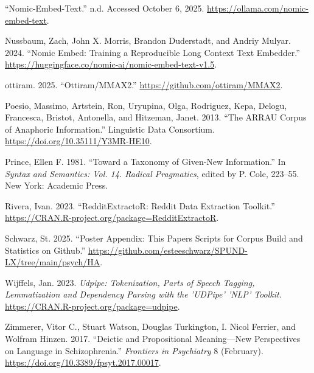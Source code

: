 \documentclass[12pt,a4paper]{article}
\begin{document}
\begin{CSLReferences}{1}{0}
{``Nomic-Embed-Text.''} n.d. Accessed October 6, 2025. \url{https://ollama.com/nomic-embed-text}.

Nussbaum, Zach, John X. Morris, Brandon Duderstadt, and Andriy Mulyar. 2024. {``Nomic {Embed}: {Training} a {Reproducible} {Long} {Context} {Text} {Embedder}.''} \url{https://huggingface.co/nomic-ai/nomic-embed-text-v1.5}.

ottiram. 2025. {``Ottiram/{MMAX2}.''} \url{https://github.com/ottiram/MMAX2}.

Poesio, Massimo, Artstein, Ron, Uryupina, Olga, Rodriguez, Kepa, Delogu, Francesca, Bristot, Antonella, and Hitzeman, Janet. 2013. {``The {ARRAU} {Corpus} of {Anaphoric} {Information}.''} Linguistic Data Consortium. \url{https://doi.org/10.35111/Y3MR-HE10}.

Prince, Ellen F. 1981. {``Toward a Taxonomy of Given-New Information.''} In \emph{Syntax and Semantics: {Vol}. 14. {Radical} {Pragmatics}}, edited by P. Cole, 223--55. New York: Academic Press.

Rivera, Ivan. 2023. {``{RedditExtractoR}: {Reddit} {Data} {Extraction} {Toolkit}.''} \url{https://CRAN.R-project.org/package=RedditExtractoR}.

Schwarz, St. 2025. {``Poster Appendix: This Papers Scripts for Corpus Build and Statistics on Github.''} \url{https://github.com/esteeschwarz/SPUND-LX/tree/main/psych/HA}.

Wijffels, Jan. 2023. \emph{Udpipe: {Tokenization}, {Parts} of {Speech} {Tagging}, {Lemmatization} and {Dependency} {Parsing} with the '{UDPipe}' '{NLP}' {Toolkit}}. \url{https://CRAN.R-project.org/package=udpipe}.

Zimmerer, Vitor C., Stuart Watson, Douglas Turkington, I. Nicol Ferrier, and Wolfram Hinzen. 2017. {``Deictic and {Propositional} {Meaning}---{New} {Perspectives} on {Language} in {Schizophrenia}.''} \emph{Frontiers in Psychiatry} 8 (February). \url{https://doi.org/10.3389/fpsyt.2017.00017}.

\end{CSLReferences}
\end{document}
